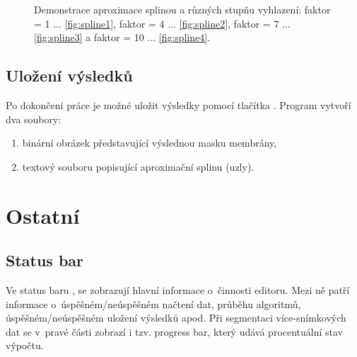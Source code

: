 \begin{figure}[htb]
	\hskip 0.1cm
	\caption{Demonstrace aproximace splinou a různých stupňu vyhlazení: faktor = 1 ... \ref{fig:spline1}, faktor = 4 ... \ref{fig:spline2}, faktor = 7 ... \ref{fig:spline3} a faktor = 10 ... \ref{fig:spline4}.}
	\label{fig:spline}
\end{figure}

\subsection{Uložení výsledků}
Po dokončení práce je možné uložit výsledky pomocí tlačítka . Program vytvoří dva soubory:
\begin{enumerate}
	\item binární obrázek představující výslednou masku membrány,
	\item textový souboru popisující aproximační splinu (uzly).
\end{enumerate}

\section{Ostatní}

\subsection{Status bar}
Ve status baru , se zobrazují hlavní informace o~činnosti editoru. Mezi ně patří informace o~úspěšném/neúspěšném načtení dat, průběhu algoritmů, úspěšném/neúspěšném uložení výsledků apod. Při segmentaci více-snímkových dat se v~pravé části zobrazí i tzv. progress bar, který udává procentuální stav výpočtu.

